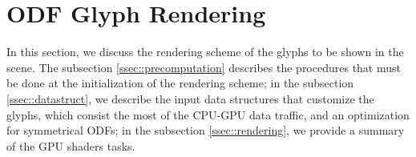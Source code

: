 \documentclass[twoside,twocolumn,10pt]{article}
\begin{document}














\section{ODF Glyph Rendering}
\label{sec::odf_glyph_rendering}

In this section, we discuss the rendering scheme of the glyphs to be shown in the scene. The subsection \ref{ssec::precomputation} describes the procedures that must be done at the initialization of the rendering scheme; in the subsection \ref{ssec::datastruct}, we describe the input data structures that customize the glyphs, which consist the most of the CPU-GPU data traffic, and an optimization for symmetrical ODFs; in the subsection \ref{ssec::rendering}, we provide a summary of the GPU shaders tasks.




\end{document}
